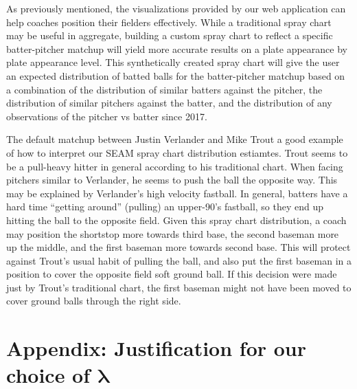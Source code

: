\documentclass[12pt]{article}
\newcommand{\lambdabf}{\boldsymbol{\lambda}}
\begin{document}
As previously mentioned, the visualizations provided by our web application can help coaches position their fielders effectively. While a traditional spray chart may be useful in aggregate, building a custom spray chart to reflect a specific batter-pitcher matchup will yield more accurate results on a plate appearance by plate appearance level. This synthetically created spray chart will give the user an expected distribution of batted balls for the batter-pitcher matchup based on a combination of the distribution of similar batters against the pitcher, the distribution of similar pitchers against the batter, and the distribution of any observations of the pitcher vs batter since 2017. 

The default matchup between Justin Verlander and Mike Trout a good example of how to interpret our SEAM spray chart distribution estiamtes. Trout seems to be a pull-heavy hitter in general according to his traditional chart. When facing pitchers similar to Verlander, he seems to push the ball the opposite way. This may be explained by Verlander's high velocity fastball. In general, batters have a hard time ``getting around'' (pulling) an upper-90's fastball, so they end up hitting the ball to the opposite field. Given this spray chart distribution, a coach may position the shortstop more towards third base, the second baseman more up the middle, and the first baseman more towards second base. This will protect against Trout's usual habit of pulling the ball, and also put the first baseman in a position to cover the opposite field soft ground ball. If this decision were made just by Trout's traditional chart, the first baseman might not have been moved to cover ground balls through the right side.













\section*{Appendix: Justification for our choice of $\lambdabf$}
\end{document}
